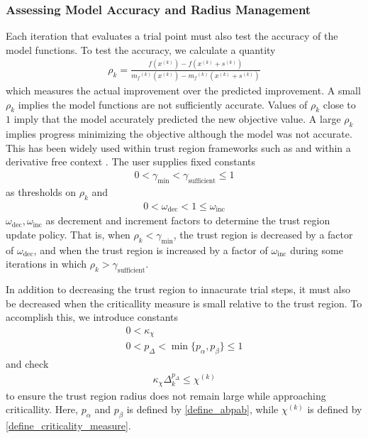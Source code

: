 \documentclass{article}
\theoremstyle{case}
\numberwithin{theorem}{subsection}
\newcommand{\chik}{{\chi^{(k)}}}
\newcommand{\dk}{\Delta_k}
\newcommand{\gammabi}{\gamma_{\textrm{sufficient}}}
\newcommand{\gammasm}{\gamma_{\textrm{min}}}
\newcommand{\mfk}{{{m}_f}^{(k)}}
\newcommand{\omegadec}{\omega_{\text{dec}}}
\newcommand{\omegainc}{\omega_{\text{inc}}}
\newcommand{\rk}{\rho_k}
\newcommand{\sk}{{{s}^{(k)}}}
\newcommand{\xk}{{x^{(k)}}}
\begin{document}
\subsubsection{Assessing Model Accuracy and Radius Management}

Each iteration that evaluates a trial point must also test the accuracy of the model functions.
To test the accuracy, we calculate a quantity
\begin{align}
\label{define_rhok}
\rk = \frac{f(\xk) - f(\xk+\sk)}{\mfk(\xk) - \mfk(\xk+\sk)}
\end{align}
which measures the actual improvement over the predicted improvement.
A small $\rk$ implies the model functions are not sufficiently accurate.
Values of $\rk$ close to $1$ imply that the model accurately predicted the new objective value.
A large $\rk$ implies progress minimizing the objective although the model was not accurate.
This has been widely used within trust region frameworks such as \cite{Conn:2000:TM:357813} and within a derivative free context \cite{DUMMY:intro_book}.
The user supplies fixed constants
\begin{align}
0 < \gammasm < \gammabi \le 1	\label{define_the_gammas}
\end{align}
as thresholds on $\rk$ and
\begin{align}
0 < \omegadec < 1 \le \omegainc		\label{define_the_omegas}
\end{align}
$\omegadec, \omegainc$ as decrement and increment factors to determine the trust region update policy.
That is, when $\rk < \gammasm$, the trust region is decreased by a factor of $\omegadec$, and when the trust region is increased by a factor of $\omegainc$
during some iterations in which $\rk > \gammabi$.

In addition to decreasing the trust region to innacurate trial steps, 
it must also be decreased when the criticallity measure is small relative to the trust region.
To accomplish this, we introduce constants
\begin{align}
0 < \kappa_{\chi} \label{define_kappa_chi} \\
0 < p_{\Delta} < \min\{p_{\alpha}, p_{\beta}\} \le 1 \label{define_p_delta} 
\end{align}
and check
\begin{align}
\kappa_{\chi} \dk^{p_{\Delta}} \le \chik \label{criticallity_check}
\end{align}
to ensure the trust region radius does not remain large while approaching criticallity.
Here,
$p_{\alpha}$ and $p_{\beta}$ is defined by \cref{define_abpab},
while $\chik$ is defined by \cref{define_criticality_measure}.
\end{document}
